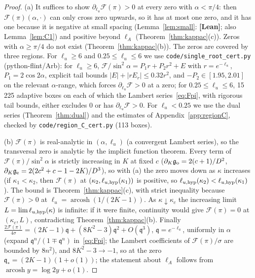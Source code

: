 \documentclass[11pt]{article}
\theoremstyle{definition}
\theoremstyle{remark}
\newcommand{\st}[1]{\textbf{[#1]}}
\begin{document}
\begin{proof}
(a) It suffices to show $\partial_{\ell_u}\mathcal F(\pi)>0$ at every zero with $\alpha<\pi/4$: then $\mathcal F(\pi)(\alpha,\cdot)$ can only
cross zero upwards, so it has at most one zero, and it has one because it is negative at small spacing (Lemma~\ref{lem:small}: \st{Lean};
also Lemma~\ref{lem:C1}) and positive beyond $\ell_A$ (Theorem~\ref{thm:kappac}(c)). Zeros with $\alpha\ge\pi/4$ do not exist
(Theorem~\ref{thm:kappac}(b)). The zeros are covered by three regions. For $\ell_u\ge6$ and $0.25\le\ell_u\le6$ we use
\nolinkurl{code/single_root_cert.py} (python-flint/Arb): for $\ell_u\ge6$, $\mathcal F/\sin^2\alpha=P_1r+P_2r^2+E$ with $r=e^{-\ell_u}$,
$P_1=2\cos2\alpha$, explicit tail bounds $|E|+|rE_r|\le0.32r^2$, and $-P_2\in[1.95,2.01]$ on the relevant $\alpha$-range, which forces
$\partial_{\ell_u}\mathcal F>0$ at a zero; for $0.25\le\ell_u\le6$, 15\,225 adaptive boxes on each of which the Lambert series~\eqref{eq:Fpi}, with
rigorous tail bounds, either excludes $0$ or has $\partial_{\ell_u}\mathcal F>0$. For $\ell_u<0.25$ we use the dual series
(Theorem~\ref{thm:dual}) and the estimates of Appendix~\ref{app:regionC}, checked by \nolinkurl{code/region_C_cert.py} (113 boxes).

(b) $\mathcal F(\pi)$ is real-analytic in $(\alpha,\ell_u)$ (a convergent Lambert series), so the transversal zero is analytic
by the implicit function theorem. Every term of $\mathcal F(\pi)/\sin^2\alpha$ is strictly increasing in $K$ at fixed $c$
($\partial_K\mathfrak g_{\rm o}=2(c+1)/D^2$, $\partial_K\mathfrak g_{\rm e}=2(2c^2+c-1-2K)/D^3$), so with (a) the zero moves down as $\kappa$
increases (if $\kappa_1<\kappa_2$, then $\mathcal F(\pi)$ at $(\kappa_2,\ell_{u,{\rm hyp}}(\kappa_1))$ is positive, so $\ell_{u,{\rm hyp}}(\kappa_2)<\ell_{u,{\rm hyp}}(\kappa_1)$). The
bound is Theorem~\ref{thm:kappac}(c), with strict inequality because $\mathcal F(\pi)>0$ at $\ell_u=\operatorname{arcosh}(1/(2K-1))$.
As $\kappa\downarrow\kappa_c$ the increasing limit $L=\lim\ell_{u,{\rm hyp}}(\kappa)$ is infinite: if it were finite, continuity would give
$\mathcal F(\pi)=0$ at $(\kappa_c,L)$, contradicting Theorem~\ref{thm:kappac}(b). Finally
$\frac{2\mathcal F(\pi)}{4\sigma}=(2K-1)\mathfrak q+(8K^2-3)\mathfrak q^2+O(\mathfrak q^3)$, $\mathfrak q=e^{-\ell_u}$, uniformly in $\alpha$
(expand $\mathfrak q^n/(1\mp\mathfrak q^n)$ in~\eqref{eq:Fpi}; the Lambert coefficients of $\mathcal F(\pi)/\sigma$ are bounded by $8n^2$), and
$8K^2-3\to-1$, so at the zero $\mathfrak q_*=(2K-1)(1+o(1))$; the statement about $\ell_A$ follows from
$\operatorname{arcosh}y=\log2y+o(1)$.


\end{proof}
\end{document}
